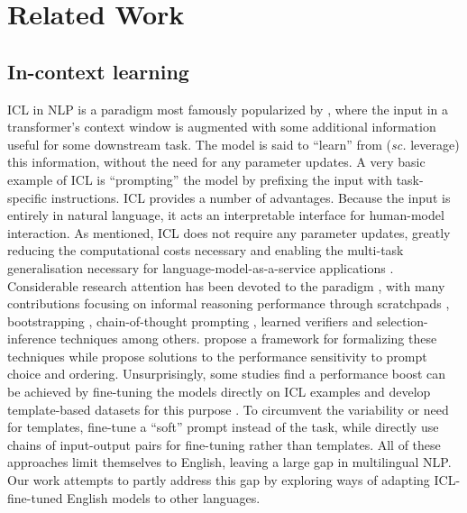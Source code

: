 \documentclass[11pt]{article}
\begin{document}
\section{Related Work}

\subsection{In-context learning}

ICL in NLP is a paradigm most famously popularized by \citet{brown_language_2020}, where the input
in a transformer's context window is augmented with some additional information useful for some
downstream task. The model is said to ``learn''  from (\textit{sc.} leverage) this information,
without the need for any parameter updates. A very basic example of ICL is ``prompting'' the model
by prefixing the input with task-specific instructions. ICL provides a number of advantages. Because
the input is entirely in natural language, it acts an interpretable interface for human-model
interaction. As mentioned, ICL does not require any parameter updates, greatly reducing the
computational costs necessary and enabling the multi-task generalisation necessary for
language-model-as-a-service applications \citep{sun_black-box_2022}. Considerable research attention
has been devoted to the paradigm \citep{liu_what_2022,lu_fantastically_2022,wu_self-adaptive_2022},
with many contributions focusing on informal reasoning performance through scratchpads
\citep{nye_show_2021}, bootstrapping \citep{zelikman_star_2022}, chain-of-thought prompting
\citep{wei_chain--thought_2022,wang_self-consistency_2023}, learned verifiers
\citep{cobbe_training_2021} and selection-inference \citep{creswell_selection-inference_2023}
techniques among others. \citet{dohan_language_2022} propose a framework for formalizing these
techniques while \citet{zhao_calibrate_2021} propose solutions to the performance sensitivity to
prompt choice and ordering. Unsurprisingly, some studies find a performance boost can be achieved by
fine-tuning the models directly on ICL examples \citep{sanh_multitask_2022,wang_benchmarking_2022}
and develop template-based datasets for this purpose
\citep{bach_promptsource_2022,mishra_cross-task_2022}. To circumvent the variability or need for
templates, \citet{lester_power_2021} fine-tune a ``soft'' prompt instead of the task, while
\citet{min_metaicl_2022} directly use chains of input-output pairs for fine-tuning rather than
templates. All of these approaches limit themselves to English, leaving a large gap in multilingual
NLP. Our work attempts to partly address this gap by exploring ways of adapting ICL-fine-tuned
English models to other languages.
\end{document}
